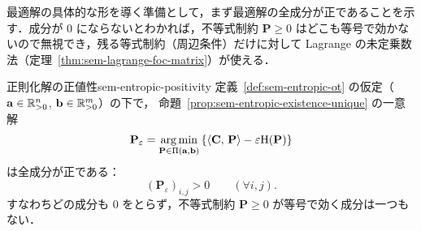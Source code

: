 最適解の具体的な形を導く準備として，まず最適解の全成分が正であることを示す．成分が $0$ にならないとわかれば，不等式制約 $\mathbf{P} \geq 0$ はどこも等号で効かないので無視でき，残る等式制約（周辺条件）だけに対して Lagrange の未定乗数法（定理~\ref{thm:sem-lagrange-foc-matrix}）が使える．

\begin{lemma}{正則化解の正値性}{sem-entropic-positivity}
  定義~\ref{def:sem-entropic-ot} の仮定（$\mathbf{a} \in \mathbb{R}_{>0}^n$, $\mathbf{b} \in \mathbb{R}_{>0}^m$）の下で，
  命題~\ref{prop:sem-entropic-existence-unique} の一意解
  \[
    \mathbf{P}_\varepsilon
    =
    \operatorname*{arg\,min}_{\mathbf{P} \in \Pi(\mathbf{a}, \mathbf{b})}
    \left\{
      \langle \mathbf{C},\, \mathbf{P} \rangle
      - \varepsilon \mathrm{H}(\mathbf{P})
    \right\}
  \]
  は全成分が正である：
  \[
    (\mathbf{P}_\varepsilon)_{i,j} > 0 \qquad (\forall i, j).
  \]
  すなわちどの成分も $0$ をとらず，不等式制約 $\mathbf{P} \geq 0$ が等号で効く成分は一つもない．
\end{lemma}

